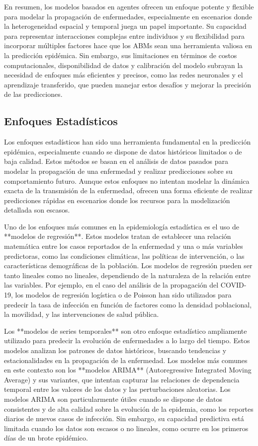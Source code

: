 En resumen, los modelos basados en agentes ofrecen un enfoque potente y flexible para modelar la propagación de enfermedades, especialmente en escenarios donde la heterogeneidad espacial y temporal juega un papel importante. Su capacidad para representar interacciones complejas entre individuos y su flexibilidad para incorporar múltiples factores hace que los ABMs sean una herramienta valiosa en la predicción epidémica. Sin embargo, sus limitaciones en términos de costos computacionales, disponibilidad de datos y calibración del modelo subrayan la necesidad de enfoques más eficientes y precisos, como las redes neuronales y el aprendizaje transferido, que pueden manejar estos desafíos y mejorar la precisión de las predicciones.

\subsection{Enfoques Estadísticos}\label{section:statistical-approaches}

Los enfoques estadísticos han sido una herramienta fundamental en la predicción epidémica, especialmente cuando se dispone de datos históricos limitados o de baja calidad. Estos métodos se basan en el análisis de datos pasados para modelar la propagación de una enfermedad y realizar predicciones sobre su comportamiento futuro. Aunque estos enfoques no intentan modelar la dinámica exacta de la transmisión de la enfermedad, ofrecen una forma eficiente de realizar predicciones rápidas en escenarios donde los recursos para la modelización detallada son escasos.

Uno de los enfoques más comunes en la epidemiología estadística es el uso de **modelos de regresión**. Estos modelos tratan de establecer una relación matemática entre los casos reportados de la enfermedad y una o más variables predictoras, como las condiciones climáticas, las políticas de intervención, o las características demográficas de la población. Los modelos de regresión pueden ser tanto lineales como no lineales, dependiendo de la naturaleza de la relación entre las variables. Por ejemplo, en el caso del análisis de la propagación del COVID-19, los modelos de regresión logística o de Poisson han sido utilizados para predecir la tasa de infección en función de factores como la densidad poblacional, la movilidad, y las intervenciones de salud pública.

Los **modelos de series temporales** son otro enfoque estadístico ampliamente utilizado para predecir la evolución de enfermedades a lo largo del tiempo. Estos modelos analizan los patrones de datos históricos, buscando tendencias y estacionalidades en la propagación de la enfermedad. Los modelos más comunes en este contexto son los **modelos ARIMA** (Autoregressive Integrated Moving Average) y sus variantes, que intentan capturar las relaciones de dependencia temporal entre los valores de los datos y las perturbaciones aleatorias. Los modelos ARIMA son particularmente útiles cuando se dispone de datos consistentes y de alta calidad sobre la evolución de la epidemia, como los reportes diarios de nuevos casos de infección. Sin embargo, su capacidad predictiva está limitada cuando los datos son escasos o no lineales, como ocurre en los primeros días de un brote epidémico.

